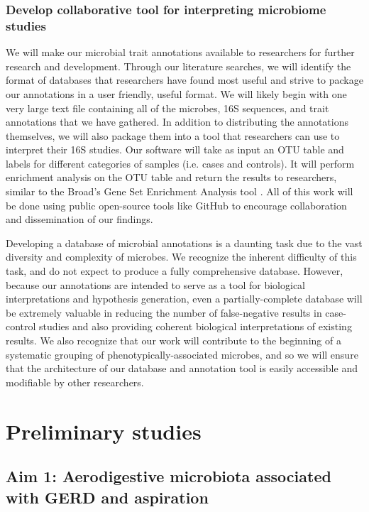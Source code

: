 \documentclass[12pt]{article}
\begin{document}
\subsubsection{Develop collaborative tool for interpreting microbiome studies}
We will make our microbial trait annotations available to researchers for 
further research and development. Through our literature searches, 
we will identify the format of databases that researchers have found most 
useful and strive to package our annotations in a user friendly, useful format. 
We will likely begin with one very large text file containing all of 
the microbes, 16S sequences, and trait annotations that we have gathered. In addition to distributing the annotations themselves, we will also package them into a tool 
that researchers can use to interpret their 16S 
studies. Our software will take as input an OTU table and labels for different categories
of samples (i.e. cases and controls). 
It will perform enrichment analysis on the OTU table and return the 
results to researchers, similar to the Broad's Gene Set Enrichment Analysis tool \cite{subramanian-gsea-2005}. All of this work will be done using public open-source tools like 
GitHub to encourage collaboration and dissemination of our findings.

Developing a database of microbial annotations is a daunting task due 
to the vast diversity and complexity of microbes. We recognize the 
inherent difficulty of this task, and do not expect to produce a fully 
comprehensive database. However, because our annotations are intended 
to serve as a tool for biological interpretations and hypothesis 
generation, even a partially-complete database will be extremely 
valuable in reducing the number of false-negative results in case-
control studies and also providing coherent biological interpretations 
of existing results. We also recognize that our work will contribute to the 
beginning of a systematic grouping of phenotypically-associated 
microbes, and so we will ensure that the architecture of our database and annotation tool 
is easily accessible and modifiable by other researchers.


\section{Preliminary studies}

\subsection{Aim 1: Aerodigestive microbiota associated with GERD and aspiration}
\end{document}
